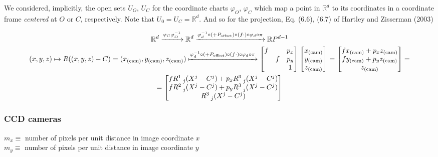\documentclass[10pt]{amsart}
\begin{document}
\begin{multicols*}{2}
We considered, implicitly, the open sets $U_O$, $U_C$ for the coordinate charts $\varphi_O$, $\varphi_C$ which map a point in $\mathbb{R}^d$ to its coordinates in a coordinate frame \emph{centered} at $O$ or $C$, respectively.  Note that $U_0 = U_C = \mathbb{R}^d$.  And so for the projection, Eq. (6.6), (6.7) of Hartley and Zisserman (2003) \cite{HaZi2003}

\[
\begin{gathered}
\mathbb{R}^d \xrightarrow{ \varphi_C \varphi_O^{-1} } \mathbb{R}^d \xrightarrow{  \varphi_d^{-1} \circ (+P_{\text{offset}} )\circ (f\cdot) \circ \varphi_d \circ \pi } \mathbb{R}P^{d-1}  \\
(x,y,z) \mapsto R((x,y,z) - C) = (x_{\text{(cam)}},y_{\text{(cam)}},z_{\text{(cam)}}) \xmapsto{  \varphi_d^{-1} \circ (+P_{\text{offset}} ) \circ (f\cdot) \circ \varphi_d \circ \pi } \left[ \begin{matrix} f & & p_x \\ & f & p_y \\ & & 1 \end{matrix} \right] \left[ \begin{matrix} x_{\text{(cam)}} \\ y_{\text{(cam)}} \\ z_{\text{(cam)}} \end{matrix} \right] = \left[ \begin{matrix} fx_{\text{(cam)}}+p_x z_{\text{(cam)}} \\ fy_{\text{(cam)}} + p_y z_{\text{(cam)}} \\ z_{\text{(cam)}} \end{matrix} \right] = \\
= \left[ \begin{matrix} fR^1_{ \  \  j}(X^j-C^j)+p_x R^3_{ \  \  j}(X^j-C^j) \\ f R^2_{ \  \  j}(X^j-C^j) + p_y R^3_{ \  \  j}(X^j-C^j) \\ R^3_{ \  \  j}(X^j-C^j) \end{matrix} \right] 
\end{gathered}
\]

\subsubsection{CCD cameras}

$m_x \equiv $ number of pixels per unit distance in image coordinate $x$  \\
$m_y \equiv $ number of pixels per unit distance in image coordinate $y$  


\end{multicols*}
\end{document}
